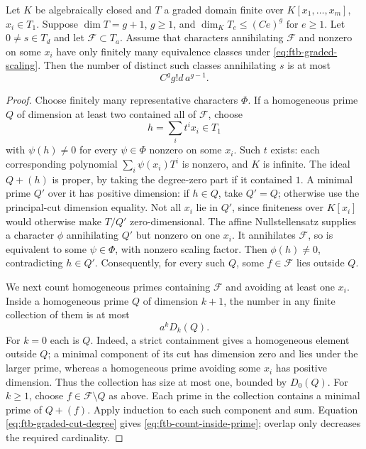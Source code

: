 \begin{lemma}
\label{lem:ftb-actual-graded-bezout}
Let \(K\) be algebraically closed and \(T\) a graded domain
finite over \(K[x_1,\ldots,x_m]\), \(x_i\in T_1\).
Suppose \(\dim T=g+1\), \(g\ge1\), and
\(\dim_KT_e\le(Ce)^g\) for \(e\ge1\).
Let \(0\ne s\in T_d\) and let \(\mathcal F\subset T_a\).
Assume that characters annihilating \(\mathcal F\) and nonzero
on some \(x_i\) have only finitely many equivalence classes
under \eqref{eq:ftb-graded-scaling}.
Then the number of distinct such classes annihilating \(s\) is at most
\[
                              C^g g!d\,a^{g-1}.
 \tag{TZ8}\label{eq:ftb-actual-graded-bezout-bound}
\]
\end{lemma}
\begin{proof}
Choose finitely many representative characters \(\Phi\).
If a homogeneous prime \(Q\) of dimension at least two
contained all of \(\mathcal F\), choose
\[
                              h=\sum_i t^ix_i\in T_1
\]
with \(\psi(h)\ne0\) for every \(\psi\in\Phi\)
nonzero on some \(x_i\).
Such \(t\) exists: each corresponding polynomial
\(\sum_i\psi(x_i)T^i\) is nonzero, and \(K\) is infinite.
The ideal \(Q+(h)\) is proper, by taking the degree-zero
part if it contained \(1\).
A minimal prime \(Q'\) over it has positive dimension:
if \(h\in Q\), take \(Q'=Q\); otherwise use the
principal-cut dimension equality.
Not all \(x_i\) lie in \(Q'\), since finiteness over
\(K[x_i]\) would otherwise make \(T/Q'\) zero-dimensional.
The affine Nullstellensatz supplies a character \(\phi\)
annihilating \(Q'\) but nonzero on one \(x_i\).
It annihilates \(\mathcal F\), so is equivalent to some
\(\psi\in\Phi\), with nonzero scaling factor.
Then \(\phi(h)\ne0\), contradicting \(h\in Q'\).
Consequently, for every such \(Q\), some \(f\in\mathcal F\)
lies outside \(Q\).

We next count homogeneous primes containing \(\mathcal F\)
and avoiding at least one \(x_i\).
Inside a homogeneous prime \(Q\) of dimension \(k+1\),
the number in any finite collection of them is at most
\[
                               a^kD_k(Q).
 \tag{TZ9}\label{eq:ftb-count-inside-prime}
\]
For \(k=0\) each is \(Q\).
Indeed, a strict containment gives a homogeneous element
outside \(Q\); a minimal component of its cut has dimension
zero and lies under the larger prime, whereas a homogeneous
prime avoiding some \(x_i\) has positive dimension.
Thus the collection has size at most one, bounded by \(D_0(Q)\).
For \(k\ge1\), choose \(f\in\mathcal F\setminus Q\) as above.
Each prime in the collection contains a minimal prime of
\(Q+(f)\).
Apply induction to each such component and sum.
Equation \eqref{eq:ftb-graded-cut-degree} gives
\eqref{eq:ftb-count-inside-prime}; overlap only decreases
the required cardinality.


\end{proof}
